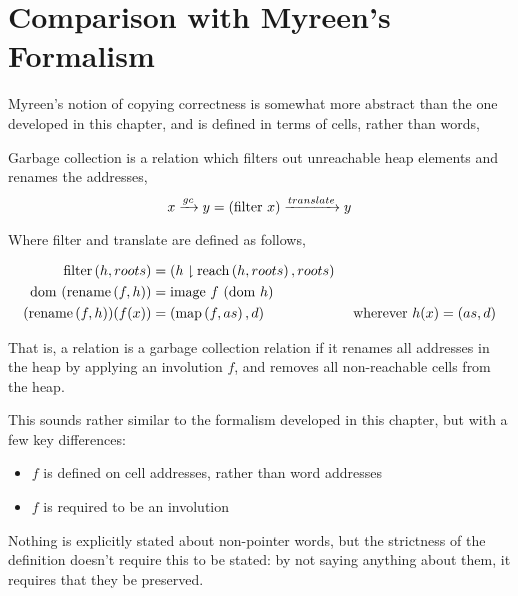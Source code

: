 \section{Comparison with Myreen's Formalism}
\label{sec:copying-myreen}

Myreen's\cite{Myreen10} notion of copying correctness is somewhat more
abstract than the one developed in this chapter, and is defined in
terms of cells, rather than words,

\begin{definition}
  \label{def:c-myreen-correctness}
  Garbage collection is a relation which filters out unreachable heap
  elements and renames the addresses, \[x \gc y = (\mathrm{filter}~x)
  \translate y\]

  Where filter and translate are defined as follows,

  \begin{prooftree}
  \end{prooftree}

  \begin{align*}
    \filter{h}{roots} &= (h \restrict \reach{h}{roots}, roots)\\
    \dom~(\rename{f}{h}) &= \mathrm{image}~f~(\dom~h)\\
    (\rename{f}{h})(f(x)) &= (\map{f}{as}, d) & \mbox{ wherever } h(x)
    = (as, d)\\
  \end{align*}
\end{definition}

That is, a relation is a garbage collection relation if it renames all
addresses in the heap by applying an involution $f$, and removes all
non-reachable cells from the heap.

This sounds rather similar to the formalism developed in this chapter,
but with a few key differences:

\begin{itemize}
\item $f$ is defined on cell addresses, rather than word addresses
\item $f$ is required to be an involution
\end{itemize}

Nothing is explicitly stated about non-pointer words, but the
strictness of the definition doesn't require this to be stated: by not
saying anything about them, it requires that they be preserved.

